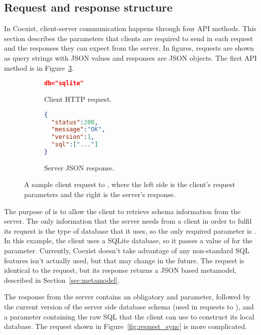 \subsection{Request and response structure}  \label{sec:}

In Coexist, client-server communication happens through four API methods.  This
section describes the parameters that clients are required to send in each
request and the responses they can expect from the server. In figures, requests
are shown as query strings with JSON values and responses are JSON objects. The
first API method is \schema in Figure~\ref{fig:request_schema}.

\begin{figure}[h!]
\begin{subfigure}[b]{0.23\textwidth}
\begin{lstlisting}[language=json]
db="sqlite"
\end{lstlisting}
\caption{Client HTTP request.}
\label{fig:gull}
\end{subfigure}%
\begin{subfigure}[b]{0.27\textwidth}
\begin{lstlisting}[language=json]
{
  "status":200,
  "message":"OK",
  "version":1,
  "sql":["..."]
}
\end{lstlisting}
\caption{Server JSON response.}
\label{fig:tiger}
\end{subfigure}
\caption{A sample client request to \schema, where the left side is the client's
request parameters and the right is the server's response.}
\label{fig:request_schema} \end{figure}

The purpose of \schema is to allow the client to retrieve schema information
from the server. The only information that the server needs from a client in
order to fulfil its request is the type of database that it uses, so the only
required parameter is . In this example, the client uses a SQLite
database, so it passes a value of  for the  parameter.
Currently, Coexist doesn't take advantage of any non-standard SQL features
 isn't actually used, but that may change in the future. The \metamodel
request is identical to the \schema request, but its response returns a JSON
based metamodel, described in Section~\ref{sec:metamodel}.

The response from the server contains an obligatory  and
 parameter, followed by the current version of the server side
database schema (used in requests to \sync), and a  parameter
containing the raw SQL that the client can use to construct its local database.
The \sync request shown in Figure~\ref{fig:request_sync} is more complicated.


